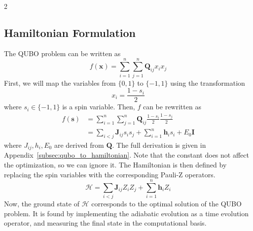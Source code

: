 \documentclass[10pt]{article}
\begin{document}
\begin{multicols*}{2}
\subsection{Hamiltonian Formulation}
The QUBO problem can be written as 
$$f(\mathbf{x}) = \sum_{i=1}^n \sum_{j=1}^n \mathbf{Q}_{ij} x_i x_j$$ 
First, we will map the variables from $\{0,1\}$ to $\{-1,1\}$ using the 
transformation $$x_i = \frac{1 - s_i}{2}$$ where $s_i \in \{-1,1\}$ is a spin variable.
Then, $f$ can be rewritten as 
\begin{align*}
f(\mathbf{s}) &= \sum_{i=1}^n \sum_{j=1}^n \mathbf{Q}_{ij} \frac{1 - s_i}{2} \frac{1 - s_j}{2} \\ 
&= \sum_{i<j} \mathbf{J}_{ij} s_i s_j + \sum_{i=1}^n \mathbf{h}_i s_i + E_0 \mathbf{I}
\end{align*}
where $J_{ij}, h_i, E_0$ are derived from $\mathbf{Q}$. The full derivation is given in Appendix~\ref{subsec:qubo_to_hamiltonian}. Note that the constant does not affect 
the optimization, so we can ignore it. The Hamiltonian is then defined by replacing the 
spin variables with the corresponding Pauli-Z operators.
$$\mathcal{H} = \sum_{i<j} \mathbf{J}_{ij} Z_i Z_j + \sum_{i=1}^n \mathbf{h}_i Z_i$$
Now, the ground state of $\mathcal{H}$ corresponds to the optimal solution of the QUBO problem. It is 
found by implementing the adiabatic evolution as a time evolution operator, and measuring the final state in 
the computational basis.

\end{multicols*}
\end{document}
